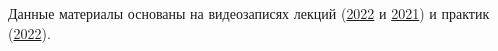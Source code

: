 Данные материалы основаны на видеозаписях лекций
(\href{https://www.youtube.com/watch?v=otErwbHi6sk&list=PLd7QXkfmSY7ZOTP3bhPT3jGoIlXql8kkX}{2022}
и \href{https://www.youtube.com/watch?v=7VYhJkOeMUI&list=PLd7QXkfmSY7Z8jlnTMIpUy2fteJgY6u3q}{2021})
и практик (\href{https://www.youtube.com/watch?v=126gMswoCPY&list=PLd7QXkfmSY7b1EikiroQt_HQy-ZcrurQE}{2022}).
